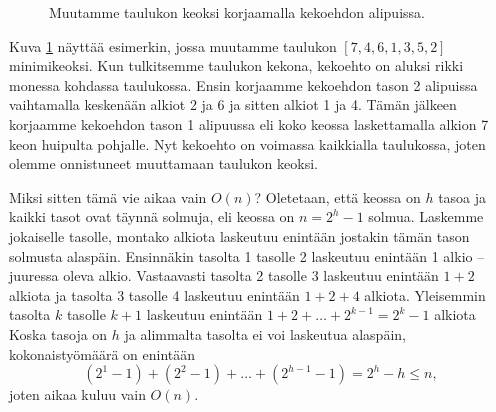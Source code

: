\begin{figure}
\caption{Muutamme taulukon keoksi korjaamalla kekoehdon alipuissa.}
\label{fig:taukek}
\end{figure}

Kuva \ref{fig:taukek} näyttää esimerkin, jossa muutamme taulukon
$[7,4,6,1,3,5,2]$ minimikeoksi.
Kun tulkitsemme taulukon kekona, kekoehto on aluksi
rikki monessa kohdassa taulukossa.
Ensin korjaamme kekoehdon tason 2 alipuissa vaihtamalla
keskenään alkiot 2 ja 6 ja sitten alkiot 1 ja 4.
Tämän jälkeen korjaamme kekoehdon tason 1 alipuussa
eli koko keossa laskettamalla alkion 7 keon huipulta pohjalle.
Nyt kekoehto on voimassa kaikkialla taulukossa,
joten olemme onnistuneet muuttamaan taulukon keoksi.

Miksi sitten tämä vie aikaa vain $O(n)$?
Oletetaan, että keossa on $h$ tasoa ja kaikki
tasot ovat täynnä solmuja, eli keossa on $n=2^h-1$ solmua.
Laskemme jokaiselle tasolle, montako alkiota laskeutuu
enintään jostakin tämän tason solmusta alaspäin.
Ensinnäkin tasolta 1 tasolle 2 laskeutuu enintään 1 alkio --
juuressa oleva alkio.
Vastaavasti
tasolta 2 tasolle 3 laskeutuu enintään $1+2$ alkiota
ja
tasolta 3 tasolle 4 laskeutuu enintään $1+2+4$ alkiota.
Yleisemmin tasolta $k$ tasolle $k+1$ laskeutuu
enintään $1+2+\dots+2^{k-1} = 2^k-1$ alkiota
Koska tasoja on $h$ ja alimmalta tasolta ei voi laskeutua alaspäin,
kokonaistyömäärä on enintään
\[(2^1-1)+(2^2-1)+\dots+(2^{h-1}-1)=2^h-h \le n,\]
joten aikaa kuluu vain $O(n)$.

